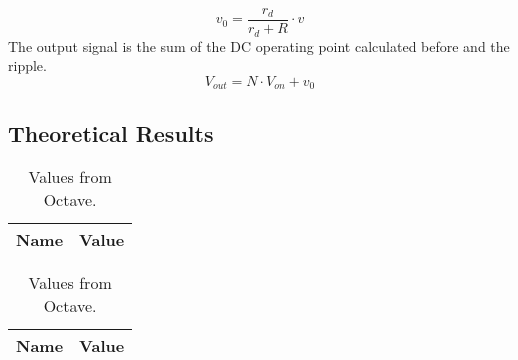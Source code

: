 \[
v_0 = \frac{r_d}{r_d+R}\cdot v
\]
The output signal is the sum of the DC operating point calculated before and the ripple.
\[
V_{out}=N \cdot V_{on} + v_0
\]


\subsection{Theoretical Results}
\label{subsec:res_the}

\begin{table}[h]
	\centering
	\begin{tabular}{|l|r|}
		\hline    
		{\bf Name} & {\bf Value} \\ \hline
    		
	\end{tabular}
	
	\caption{Values from Octave.}
    
\label{tab:op_teo}
\end{table}

\begin{table}[h]
	\centering
	\begin{tabular}{|l|r|}
		\hline    
		{\bf Name} & {\bf Value} \\ \hline
    		
	\end{tabular}
	
	\caption{Values from Octave.}
    
\label{tab:imp_teo}
\end{table}
